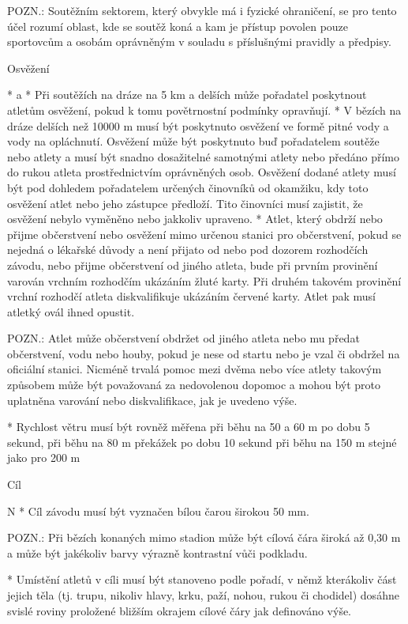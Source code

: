 POZN.: Soutěžním sektorem, který obvykle má i fyzické ohraničení, se pro tento účel rozumí oblast, kde se soutěž koná a kam je přístup povolen pouze sportovcům a osobám oprávněným v souladu s příslušnými pravidly a předpisy.

Osvěžení

* \begitems \style a
  * Při soutěžích na dráze na 5 km a delších může pořadatel poskytnout atletům osvěžení, pokud k tomu povětrnostní podmínky opravňují.
  * V bězích na dráze delších než 10000 m musí být poskytnuto osvěžení ve formě pitné vody a vody na opláchnutí. Osvěžení může být poskytnuto buď pořadatelem soutěže nebo atlety a musí být snadno dosažitelné samotnými atlety nebo předáno přímo do rukou atleta prostřednictvím oprávněných osob. Osvěžení dodané atlety musí být pod dohledem pořadatelem určených činovníků od okamžiku, kdy toto osvěžení atlet nebo jeho zástupce předloží. Tito činovníci musí zajistit, že osvěžení nebylo vyměněno nebo jakkoliv upraveno.
  * Atlet, který obdrží nebo přijme občerstvení nebo osvěžení mimo určenou stanici pro občerstvení, pokud se nejedná o lékařské důvody a není přijato od nebo pod dozorem rozhodčích závodu, nebo přijme občerstvení od jiného atleta, bude při prvním provinění varován vrchním rozhodčím ukázáním žluté karty. Při druhém takovém provinění vrchní rozhodčí atleta diskvalifikuje ukázáním červené karty. Atlet pak musí atletký ovál ihned opustit.
  \enditems

POZN.: Atlet může občerstvení obdržet od jiného atleta nebo mu předat občerstvení, vodu nebo houby, pokud je nese od startu nebo je vzal či obdržel na oficiální stanici. Nicméně trvalá pomoc mezi dvěma nebo více atlety takovým způsobem může být považovaná za nedovolenou dopomoc a mohou být proto uplatněna varování nebo diskvalifikace, jak je uvedeno výše.

* Rychlost větru musí být rovněž měřena
při běhu na 50 a 60 m           po dobu 5 sekund,
při běhu na 80 m překážek    po dobu 10 sekund
při běhu na 150 m                 stejné jako pro 200 m
\enditems

\secc Cíl

\begitems \style N
* Cíl závodu musí být vyznačen bílou čarou širokou 50 mm.

POZN.: Při bězích konaných mimo stadion může být cílová čára široká až 0,30 m a může být jakékoliv barvy výrazně kontrastní vůči podkladu.

* Umístění atletů v cíli musí být stanoveno podle pořadí, v němž kterákoliv část jejich těla (tj. trupu, nikoliv hlavy, krku, paží, nohou, rukou či chodidel) dosáhne svislé roviny proložené bližším okrajem cílové čáry jak definováno výše.


